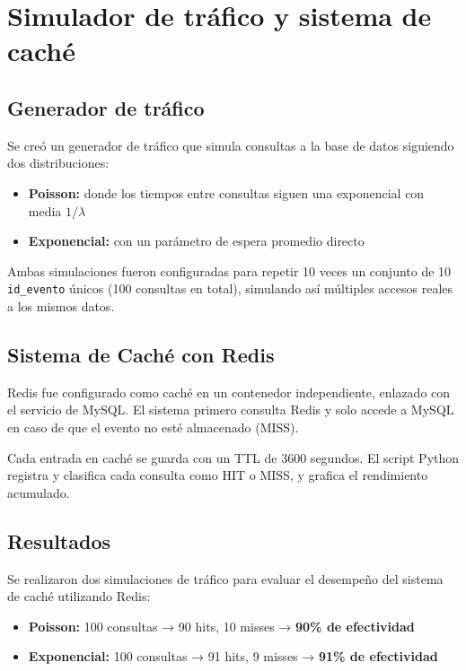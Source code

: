 \documentclass[12pt]{article}
\begin{document}
\section{Simulador de tráfico y sistema de caché}

\subsection{Generador de tráfico}

Se creó un generador de tráfico que simula consultas a la base de datos siguiendo dos distribuciones:

\begin{itemize}
    \item \textbf{Poisson:} donde los tiempos entre consultas siguen una exponencial con media $1/\lambda$
    \item \textbf{Exponencial:} con un parámetro de espera promedio directo
\end{itemize}

Ambas simulaciones fueron configuradas para repetir 10 veces un conjunto de 10 \texttt{id\_evento} únicos (100 consultas en total), simulando así múltiples accesos reales a los mismos datos.

\subsection{Sistema de Caché con Redis}

Redis fue configurado como caché en un contenedor independiente, enlazado con el servicio de MySQL. El sistema primero consulta Redis y solo accede a MySQL en caso de que el evento no esté almacenado (MISS).

Cada entrada en caché se guarda con un TTL de 3600 segundos. El script Python registra y clasifica cada consulta como HIT o MISS, y grafica el rendimiento acumulado.

\subsection{Resultados}

Se realizaron dos simulaciones de tráfico para evaluar el desempeño del sistema de caché utilizando Redis:

\begin{itemize}
    \item \textbf{Poisson:} 100 consultas → 90 hits, 10 misses → \textbf{90\% de efectividad}
    \item \textbf{Exponencial:} 100 consultas → 91 hits, 9 misses → \textbf{91\% de efectividad}
\end{itemize}
\end{document}
